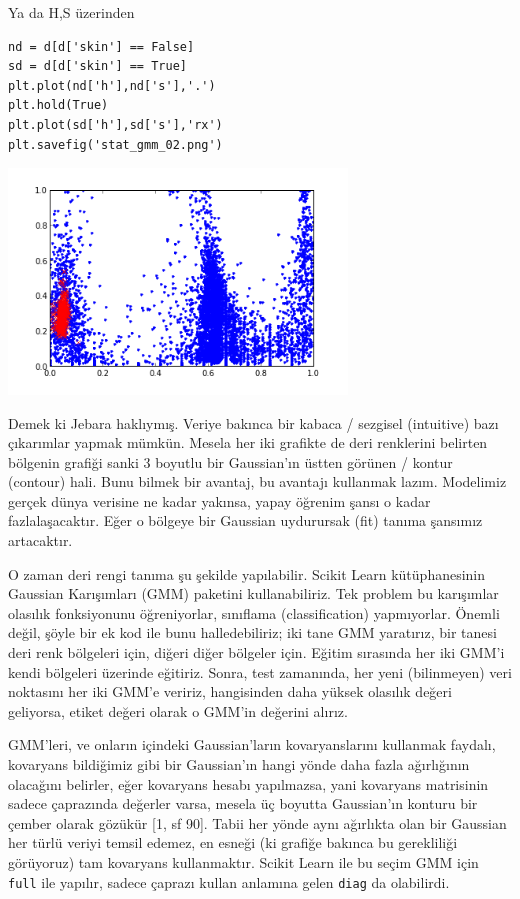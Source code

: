 \documentclass[12pt,fleqn]{article}\usepackage{../../common}
\begin{document}
Ya da H,S üzerinden

\begin{verbatim}
nd = d[d['skin'] == False]
sd = d[d['skin'] == True]
plt.plot(nd['h'],nd['s'],'.')
plt.hold(True)
plt.plot(sd['h'],sd['s'],'rx')
plt.savefig('stat_gmm_02.png')
\end{verbatim}

\includegraphics[height=6cm]{stat_gmm_02.png}

Demek ki Jebara haklıymış. Veriye bakınca bir kabaca / sezgisel (intuitive)
bazı çıkarımlar yapmak mümkün. Mesela her iki grafikte de deri renklerini
belirten bölgenin grafiği sanki 3 boyutlu bir Gaussian'ın üstten görünen /
kontur (contour) hali. Bunu bilmek bir avantaj, bu avantajı kullanmak
lazım. Modelimiz gerçek dünya verisine ne kadar yakınsa, yapay öğrenim
şansı o kadar fazlalaşacaktır. Eğer o bölgeye bir Gaussian uydurursak (fit)
tanıma şansımız artacaktır.

O zaman deri rengi tanıma şu şekilde yapılabilir. Scikit Learn
kütüphanesinin Gaussian Karışımları (GMM) paketini kullanabiliriz. Tek
problem bu karışımlar olasılık fonksiyonunu öğreniyorlar, sınıflama
(classification) yapmıyorlar. Önemli değil, şöyle bir ek kod ile bunu
halledebiliriz; iki tane GMM yaratırız, bir tanesi deri renk bölgeleri
için, diğeri diğer bölgeler için. Eğitim sırasında her iki GMM'i kendi
bölgeleri üzerinde eğitiriz. Sonra, test zamanında, her yeni (bilinmeyen)
veri noktasını her iki GMM'e veririz, hangisinden daha yüksek olasılık
değeri geliyorsa, etiket değeri olarak o GMM'in değerini alırız.

GMM'leri, ve onların içindeki Gaussian'ların kovaryanslarını kullanmak
faydalı, kovaryans bildiğimiz gibi bir Gaussian'ın hangi yönde daha fazla
ağırlığının olacağını belirler, eğer kovaryans hesabı yapılmazsa, yani
kovaryans matrisinin sadece çaprazında değerler varsa, mesela üç boyutta
Gaussian'ın konturu bir çember olarak gözükür [1, sf 90]. Tabii her yönde
aynı ağırlıkta olan bir Gaussian her türlü veriyi temsil edemez, en esneği
(ki grafiğe bakınca bu gerekliliği görüyoruz) tam kovaryans
kullanmaktır. Scikit Learn ile bu seçim GMM için \verb!full! ile yapılır,
sadece çaprazı kullan anlamına gelen \verb!diag! da olabilirdi.
\end{document}
